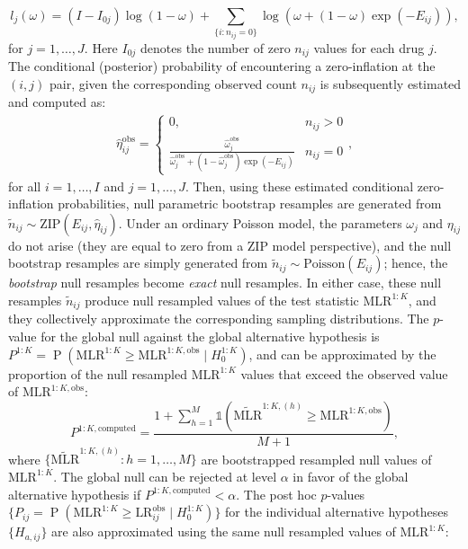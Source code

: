 \[
l_j(\omega) = (I - I_{0j}) \log (1 - \omega) + \sum_{\{i: n_{i j} = 0\}} \log \left(\omega + (1-\omega) \exp(-E_{i j}) \right),
\] for \(j=1, \dots, J\). Here \(I_{0 j}\) denotes the number of zero \(n_{ij}\) values for each drug \(j\). The conditional (posterior) probability of encountering a zero-inflation at the \((i, j)\) pair, given the corresponding observed count \(n_{ij}\) is subsequently estimated and computed as: \[\begin{aligned}
\hat \eta_{i j}^\text{obs}=
\begin{cases}
0, & n_{i j} > 0 \\
\frac{\hat \omega_{j}^\text{obs}}{\hat \omega_{j}^\text{obs} + (1-\hat \omega_{j}^\text{obs})\exp( - E_{i j})} & n_{i j} = 0
\end{cases},
\end{aligned}
\] for all \(i = 1, \dots, I\) and \(j = 1, \dots, J\). Then, using these estimated conditional zero-inflation probabilities, null parametric bootstrap resamples are generated from \(\tilde n_{i j} \sim \text{ZIP}(E_{i j}, \hat \eta_{i j})\). Under an ordinary Poisson model, the parameters \(\omega_{j}\) and \(\eta_{i j}\) do not arise (they are equal to zero from a ZIP model perspective), and the null bootstrap resamples are simply generated from \(\tilde n_{i j} \sim \text{Poisson}(E_{i j})\); hence, the \emph{bootstrap} null resamples become \emph{exact} null resamples. In either case, these null resamples \(\tilde n_{ij}\) produce null resampled values of the test statistic \(\text{MLR}^{1:K}\), and they collectively approximate the corresponding sampling distributions. The \(p\)-value for the global null against the global alternative hypothesis is \(P^{1:K} = \operatorname{P}(\text{MLR}^{1:K}\geq \text{MLR}^{1:K, \text{obs}} \mid H_{0}^{1:K})\), and can be approximated by the proportion of the null resampled \(\text{MLR}^{1:K}\) values that exceed the observed value of \(\text{MLR}^{1:K, \text{obs}}\): \[
P^{1:K, \text{computed}} = \frac{1 + \sum_{h=1}^M \mathbb{1}\left(\widetilde{\text{MLR}}^{1:K, (h)} \geq \text{MLR}^{1:K, \text{obs}} \right)}{M+1},
\] where \(\{\widetilde{\text{MLR}}^{1:K, (h)}: h = 1, \dots, M\}\) are bootstrapped resampled null values of \(\text{MLR}^{1:K}\). The global null can be rejected at level \(\alpha\) in favor of the global alternative hypothesis if \(P^{1:K, \text{computed}} < \alpha\). The post hoc \(p\)-values \(\{P_{ij} = \operatorname{P}(\text{MLR}^{1:K}\geq \text{LR}_{ij}^{\text{obs}} \mid H_{0}^{1:K}) \}\) for the individual alternative hypotheses \(\{H_{a, i j}\}\) are also approximated using the same null resampled values of \(\text{MLR}^{1:K}\): \[
\]
